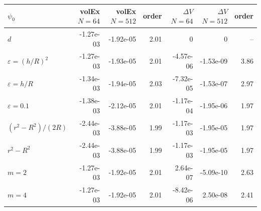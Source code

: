 \begin{tabular}{lrrrrrr}
\toprule
$\psi_0$ & volEx $N{=}64$ & volEx $N{=}512$ & order & $\Delta V$ $N{=}64$ & $\Delta V$ $N{=}512$ & order \\
\midrule
$d$ & -1.27e-03 & -1.92e-05 & 2.01 & 0 & 0 & -- \\
$\varepsilon=(h/R)^2$ & -1.27e-03 & -1.93e-05 & 2.01 & -4.57e-06 & -1.53e-09 & 3.86 \\
$\varepsilon=h/R$ & -1.34e-03 & -1.94e-05 & 2.03 & -7.32e-05 & -1.53e-07 & 2.97 \\
$\varepsilon=0.1$ & -1.38e-03 & -2.12e-05 & 2.01 & -1.17e-04 & -1.95e-06 & 1.97 \\
$(r^2-R^2)/(2R)$ & -2.44e-03 & -3.88e-05 & 1.99 & -1.17e-03 & -1.95e-05 & 1.97 \\
$r^2-R^2$ & -2.44e-03 & -3.88e-05 & 1.99 & -1.17e-03 & -1.95e-05 & 1.97 \\
$m=2$ & -1.27e-03 & -1.92e-05 & 2.01 & 2.64e-07 & -5.09e-10 & 2.63 \\
$m=4$ & -1.27e-03 & -1.92e-05 & 2.01 & -8.42e-06 & 2.50e-08 & 2.41 \\
\bottomrule
\end{tabular}
